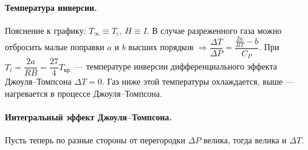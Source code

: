  \paragraph{Температура инверсии.} Пояснение к графику: $T_\infty\equiv T_i,\ H\equiv I$. В случае разреженного газа можно отбросить малые поправки $a$ и $b$ высших порядков $\Rightarrow\dfrac{\Delta T}{\Delta P}=\dfrac{\frac{2a}{RT}-b}{C_P}$. При $T_i=\dfrac{2a}{RB}=\dfrac{27}{4}T_\text{кр.}$ --- температуре инверсии дифференциального эффекта Джоуля--Томпсона  $\Delta T=0$. Газ ниже этой температуры охлаждается, выше --- нагревается в процессе Джоуля--Томпсона. \\
 \paragraph{Интегральный эффект Джоуля--Томпсона.} Пусть теперь по разные стороны от перегородки $\Delta P$ велика, тогда велика и $\Delta T$. 